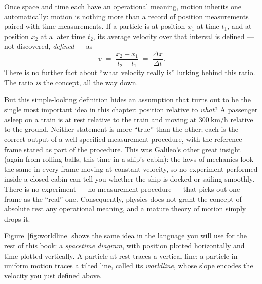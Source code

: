 \documentclass[12pt]{book}
\begin{document}
Once space and time each have an operational meaning, motion inherits one automatically: motion is nothing more than a record of position measurements paired with time measurements. If a particle is at position $x_1$ at time $t_1$, and at position $x_2$ at a later time $t_2$, its average velocity over that interval is defined --- not discovered, \emph{defined} --- as
\[
  \bar v \;=\; \frac{x_2 - x_1}{t_2 - t_1} \;=\; \frac{\Delta x}{\Delta t}.
\]
There is no further fact about ``what velocity really is'' lurking behind this ratio. The ratio \emph{is} the concept, all the way down.

But this simple-looking definition hides an assumption that turns out to be the single most important idea in this chapter: position relative to \emph{what}? A passenger asleep on a train is at rest relative to the train and moving at \(300\ \text{km/h}\) relative to the ground. Neither statement is more ``true'' than the other; each is the correct output of a well-specified measurement procedure, with the reference frame stated as part of the procedure. This was Galileo's other great insight (again from rolling balls, this time in a ship's cabin): the laws of mechanics look the same in every frame moving at constant velocity, so no experiment performed inside a closed cabin can tell you whether the ship is docked or sailing smoothly. There is no experiment --- no measurement procedure --- that picks out one frame as the ``real'' one. Consequently, physics does not grant the concept of absolute rest any operational meaning, and a mature theory of motion simply drops it.

Figure~\ref{fig:worldline} shows the same idea in the language you will use for the rest of this book: a \emph{spacetime diagram}, with position plotted horizontally and time plotted vertically. A particle at rest traces a vertical line; a particle in uniform motion traces a tilted line, called its \emph{worldline}, whose slope encodes the velocity you just defined above.
\end{document}
